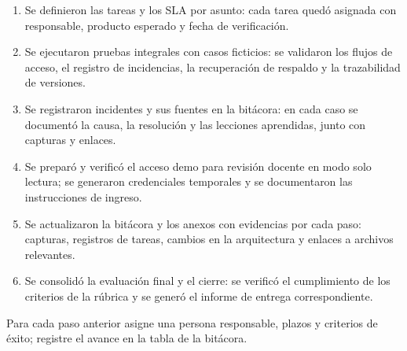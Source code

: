 \documentclass[
  spanish,
  letterpaper, oneside
]{article}
\begin{document}
  \begin{enumerate}
    \item Se definieron las tareas y los SLA por asunto: cada tarea quedó asignada con responsable, producto esperado y fecha de verificación.
    \item Se ejecutaron pruebas integrales con casos ficticios: se validaron los flujos de acceso, el registro de incidencias, la recuperación de respaldo y la trazabilidad de versiones.
    \item Se registraron incidentes y sus fuentes en la bitácora: en cada caso se documentó la causa, la resolución y las lecciones aprendidas, junto con capturas y enlaces.
    \item Se preparó y verificó el acceso demo para revisión docente en modo solo lectura; se generaron credenciales temporales y se documentaron las instrucciones de ingreso.
    \item Se actualizaron la bitácora y los anexos con evidencias por cada paso: capturas, registros de tareas, cambios en la arquitectura y enlaces a archivos relevantes.
    \item Se consolidó la evaluación final y el cierre: se verificó el cumplimiento de los criterios de la rúbrica y se generó el informe de entrega correspondiente.
  \end{enumerate}

Para cada paso anterior asigne una persona responsable, plazos y criterios de éxito; registre el avance en la tabla de la bitácora.

% 
% 
% 
\end{document}

